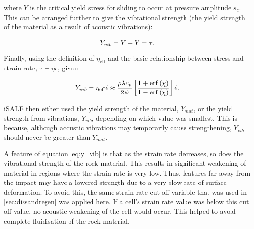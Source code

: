 where $\bar{Y}$ is the critical yield stress for sliding to occur at pressure amplitude $s_c$. This can be arranged further to give the vibrational strength (the yield strength of the material as a result of acoustic vibrations):

\begin{equation}
Y_{vib} = Y - \bar{Y} = \tau. \vspace{0.2cm}
\end{equation} 

Finally, using the definition of $\eta_{\text{eff}}$ \citep{collins2003acoustic} and the basic relationship between stress and strain rate, $\tau = \eta \dot{\epsilon}$, gives:

\begin{equation} \label{eq:y_vib}
Y_{vib} = \eta_{\text{eff}} \dot{\epsilon} \approx  \frac{\rho \lambda c_{p}}{2 \psi} \left[ \frac{1+\erf\left(\chi\right)}{1-\erf\left(\chi\right)} \right] \dot{\epsilon}.\vspace{0.2cm}
\end{equation} 

iSALE then either used the yield strength of the material, $Y_{mat}$, or the yield strength from vibrations, $Y_{vib}$, depending on which value was smallest. This is because, although acoustic vibrations may temporarily cause strengthening, $Y_{vib}$ should never be greater than $Y_{mat}$.

A feature of equation \ref{eq:y_vib} is that as the strain rate decreases, so does the vibrational strength of the rock material. This results in significant weakening of material  in regions where the strain rate is very low. Thus, features far away from the impact may have a lowered strength due to a very slow rate of surface deformation. To avoid this, the same strain rate cut off variable that was used in \ref{sec:dissandregen} was applied here. If a cell's strain rate value was below this cut off value, no acoustic weakening of the cell would occur. This helped to avoid complete fluidisation of the rock material. 